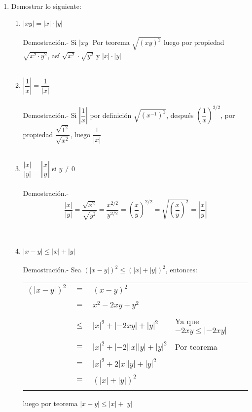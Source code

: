 \begin{enumerate}[\bfseries 1.]
\item Demostrar lo siguiente:
\begin{enumerate}[\bfseries (i)]
\item $|xy|=|x|\cdot |y|$\\\\
Demostración.- \; Si $|xy|$ Por teorema  \; $\sqrt{(xy)^2}$ luego por propiedad \; $\sqrt{x^2 \cdot y^2}$, así $\sqrt{x^2}\cdot \sqrt{y^2}$ \; y \;  $|x|\cdot |y|$\\\\

\item $\left| \dfrac{1}{x} \right|=\dfrac{1}{|x|}$\\\\
Demostración.- \; Si $\left| \dfrac{1}{x} \right|$ por definición $\sqrt{(x^{-1})^2}$, después $\left( \dfrac{1}{x}\right) ^{2/2}$, por propiedad  \; $\dfrac{\sqrt{1^2}}{\sqrt{x^2}}$, luego $\dfrac{1}{|x|}$  \\\\ 

\item $\dfrac{|x|}{|y|}=\left| \dfrac{x}{y} \right|$ si $y\neq 0$\\\\
Demostración.- $$ \dfrac{|x|}{|y|} = \dfrac{\sqrt{x^2}}{\sqrt{y^2}}=\dfrac{x^{2/2}}{y^{2/2}}=\left( \dfrac{x}{y} \right)^{2/2} = \sqrt{\left( \dfrac{x}{y} \right)^2}=\left| \dfrac{x}{y} \right| $$ \\\\

\item $|x-y|\leq |x|+|y|$\\\\
Demostración.- \; Sea $(|x-y|)^2\leq( |x|+|y| )^2$, entonces:
\begin{center}
\begin{tabular}{r c l l}
$(|x-y|)^2$&$=$&$(x-y)^2$&\\\\
&$=$&$x^2-2xy+y^2$&\\\\
&$\leq$&$|x|^2+|-2xy|+|y|^2$&Ya que $-2xy\leq |-2xy|$\\\\
&$=$&$|x|^2+|-2||x||y|+|y|^2$&Por teorema\\\\
&$=$&$|x|^2+2|x||y|+|y|^2$&\\\\
&$=$&$(|x|+|y|)^2$&\\\\
\end{tabular}
\end{center}
luego por teorema \; $|x-y|\leq |x|+|y|$\\\\


\end{enumerate}
\end{enumerate}
